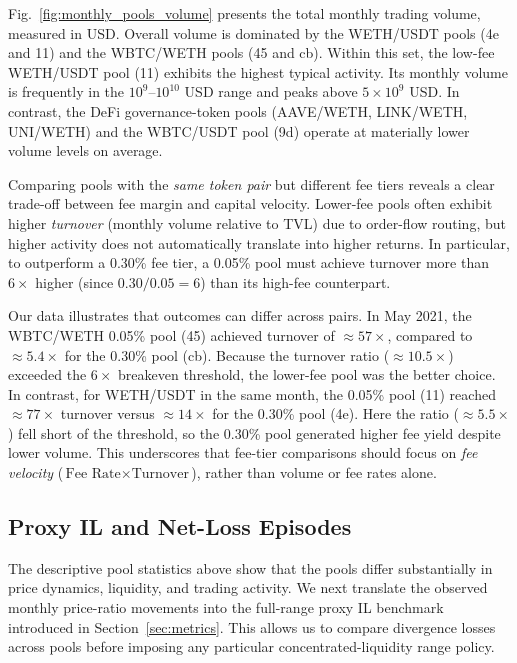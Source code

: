 \documentclass[anonymous]{lipics-v2021}
\begin{document}
{Fig.~\ref{fig:monthly_pools_volume} presents the total monthly trading volume, measured in USD. 
Overall volume is dominated by the WETH/USDT pools (4e and 11) and the WBTC/WETH pools (45 and cb). 
Within this set, the low-fee WETH/USDT pool (11) exhibits the highest typical activity. 
Its monthly volume is frequently in the $10^{9}$--$10^{10}$ USD range and peaks above $5\times10^{9}$ USD. 
In contrast, the DeFi governance-token pools (AAVE/WETH, LINK/WETH, UNI/WETH) and the WBTC/USDT pool (9d) operate at materially lower volume levels on average.

Comparing pools with the \emph{same token pair} but different fee tiers reveals a clear trade-off between fee margin and capital velocity. 
Lower-fee pools often exhibit higher \emph{turnover} (monthly volume relative to TVL) due to order-flow routing, but higher activity does not automatically translate into higher returns. 
In particular, to outperform a 0.30\% fee tier, a 0.05\% pool must achieve turnover more than $6\times$ higher (since $0.30/0.05=6$) than its high-fee counterpart.

Our data illustrates that outcomes can differ across pairs. 
In May 2021, the WBTC/WETH 0.05\% pool (45) achieved turnover of $\approx57\times$, compared to $\approx5.4\times$ for the 0.30\% pool (cb). 
Because the turnover ratio ($\approx10.5\times$) exceeded the $6\times$ breakeven threshold, the lower-fee pool was the better choice. 
In contrast, for WETH/USDT in the same month, the 0.05\% pool (11) reached $\approx77\times$ turnover versus $\approx14\times$ for the 0.30\% pool (4e). 
Here the ratio ($\approx5.5\times$) fell short of the threshold, so the 0.30\% pool generated higher fee yield despite lower volume. 
This underscores that fee-tier comparisons should focus on \emph{fee velocity} ($\text{Fee Rate}\times\text{Turnover}$), rather than volume or fee rates alone.




\subsection{Proxy IL and Net-Loss Episodes}

The descriptive pool statistics above show that the pools differ substantially in price dynamics, liquidity, and trading activity. 
We next translate the observed monthly price-ratio movements into the full-range proxy IL benchmark introduced in Section~\ref{sec:metrics}. 
This allows us to compare divergence losses across pools before imposing any particular concentrated-liquidity range policy.

}
\end{document}
